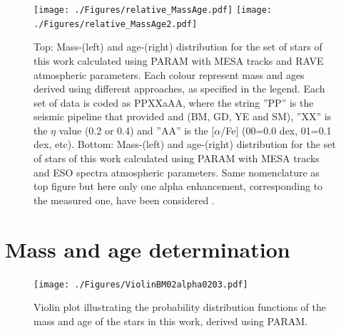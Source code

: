 \documentclass{aa}
\begin{document}
   \begin{figure}
   \centering
   \texttt{[image: ./Figures/relative\_MassAge.pdf]}
   \texttt{[image: ./Figures/relative\_MassAge2.pdf]}
   \caption{Top: Mass-\FeH (left) and age-\FeH (right) distribution for the set of stars of this work calculated using PARAM with MESA tracks and RAVE atmospheric parameters. Each colour represent mass and ages derived using different approaches, as specified in the legend. Each set of data is coded as PPXXaAA, where the string ''PP'' is the seismic pipeline that provided \dnu and \numax (BM, GD, YE and SM), ''XX'' is the $\eta$ value (0.2 or 0.4) and ''AA'' is the [$\alpha$/Fe] (00=0.0 dex, 01=0.1 dex, etc). Bottom: Mass-\FeH (left) and age-\FeH (right) distribution for the set of stars of this work calculated using PARAM with MESA tracks and ESO spectra atmospheric parameters. Same nomenclature as top figure but here only one alpha enhancement, corresponding to the measured one, have been considered .}
              \label{Fig:relative}%
    \end{figure}

\section{Mass and age determination}
\label{Sect:massage}


   \begin{figure}
   \centering
   \texttt{[image: ./Figures/ViolinBM02alpha0203.pdf]}
   \caption{Violin plot illustrating the probability distribution functions of the mass and age of the stars in this work, derived using PARAM.}
              \label{Fig:violin}%
    \end{figure}
\end{document}
